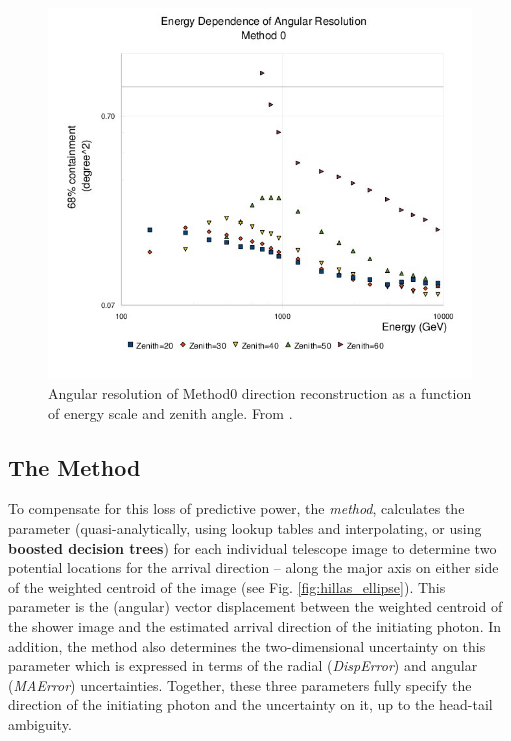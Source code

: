 \documentclass[main.tex]{subfiles}
\begin{document}
\begin{figure}[htbp]
  \centering
  \includegraphics[width=.6\linewidth]{images/Method0_res}
  \caption[Angular resolution of Method0.]{Angular resolution of Method0 direction reconstruction as a function of energy scale and zenith angle. From \cite{veritas_web}.}
  \label{fig:disp_res}
\end{figure}

\subsection{The \disp Method}
To compensate for this loss of predictive power, the \disp \textit{method}, calculates the \disp parameter (quasi-analytically, using lookup tables and interpolating, or using \textbf{boosted decision trees}) for each individual telescope image to determine two potential locations for the arrival direction -- along the major axis on either side of the weighted centroid of the image (see Fig. \ref{fig:hillas_ellipse}). This parameter is the (angular) vector displacement between the weighted centroid of the shower image and the estimated arrival direction of the initiating photon. In addition, the method also determines the two-dimensional uncertainty on this parameter which is expressed in terms of the radial ({\it DispError}) and angular ({\it MAError}) uncertainties. Together, these three parameters fully specify the direction of the initiating photon and the uncertainty on it, up to the head-tail ambiguity.
\end{document}
